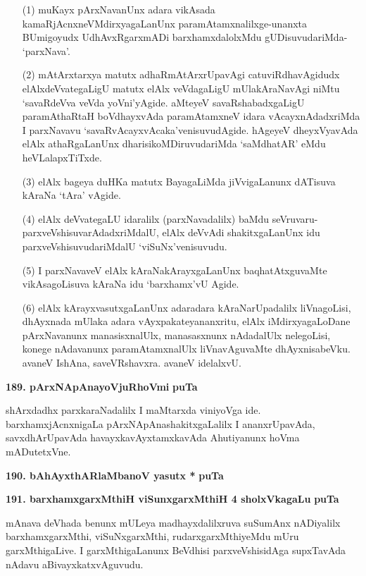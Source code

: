 \begin{itemize}
\item[(1)] muKayx pArxNavanUnx adara vikAsada kamaRjAcnxneVMdirxyagaLanUnx paramAtamxnalilxge-unanxta BUmi\-goyudx UdhAvxRgarxmADi barxhamxdalolxMdu gUDisu\-vudariMda- `parxNava'.
\item[(2)] mAtArxtarxya matutx adhaRmAtArxrUpavAgi catuviRdhavAgidudx elAlx\break deVvategaLigU matutx elAlx veVdagaLigU mUlakAraNavAgi niMtu `savaR\-deVva veVda yoVni'yAgide. aMteyeV savaR\-shabadx\-gaLigU paramAthaRtaH boVdhayxvAda paramAtamxneV idara vAcayxnAdadxriMda I parxNavavu `savaR\-vAcayx\-vAcaka'venisuvudAgide. hAgeyeV dheyxVyavAda elAlx athaRgaLanUnx dharisikoMDiruvuda\-riMda `saMdhatAR' eMdu heVLalapxTiTxde.
\item[(3)] elAlx bageya duHKa matutx BayagaLiMda jiVvigaLanunx dATisuva kAraNa `tAra' vAgide.
\item[(4)] elAlx deVvategaLU idaralilx (parxNavadalilx) baMdu seVruvaru-parxveVshisu\-varAdadxriMdalU, elAlx deVvAdi shakitxgaLanUnx idu parxveVshisuvudariMdalU `viSuNx'venisuvudu.
\item[(5)] I parxNavaveV elAlx kAraNakArayxgaLanUnx baqhatAtxguvaMte vikAsagoLisuva kAraNa idu `barxhamx'vU Agide.
\item[(6)] elAlx kArayxvasutxgaLanUnx adaradara kAraNarUpadalilx liVnagoLisi, dhAyxnada mUlaka adara vAyxpa\-kateyananxritu, elAlx iMdirxyagaLoDane pArxNavanunx manasisxnalUlx, manasasxnunx nAdadalUlx nele\-goLisi, konege nAdavanunx paramAtamxnalUlx liVnavAguvaMte dhAyxnisabeVku. avaneV IshAna, saveVRshavxra. avaneV idelalxvU.
\end{itemize}

\medskip
\noindent
\textbf{189. pArxNApAnayoVjuRhoVmi} \hfill{\bf puTa \pageref{186}}

\smallskip
shArxdadhx parxkaraNadalilx I maMtarxda viniyoVga ide. barxhamxjAcnxnigaLa pArxNApAnashakitxgaLalilx I ananxrUpa\-vAda, savxdhArUpavAda havayxkavAyxtamxkavAda Ahutiyanunx hoVma mADutetxVne.

\medskip
\noindent
\textbf{190. bAhAyxthARlaMbanoV yasutx *} \hfill{\bf puTa \pageref{225}}

\medskip
\noindent
\textbf{191. barxhamxgarxMthiH viSunxgarxMthiH 4 sholxVkagaLu} \hfill{\bf puTa \pageref{150}}

\smallskip
mAnava deVhada benunx mULeya madhayxdalilxruva suSumAnx nADiyalilx barxhamxgarxMthi, viSuNxgarxMthi, rudarxgarxMthiyeMdu mUru garxMthigaLive. I garxMthigaLanunx BeVdhisi parxveVshisidAga supxTavAda nAdavu aBi\-vayxkatxvAguvudu.

